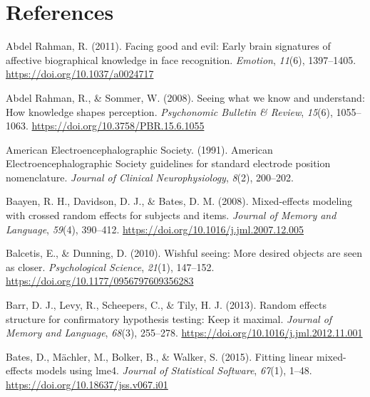 \documentclass[
  english,
  man,11pt,floatsintext]{apa7}
\begin{document}
\newpage

\hypertarget{references}{%
\section{References}\label{references}}

\setlength{\parindent}{-0.5in}
\setlength{\leftskip}{0.5in}

\hypertarget{refs}{}
\leavevmode\hypertarget{ref-abdelrahman2011}{}%
Abdel Rahman, R. (2011). Facing good and evil: Early brain signatures of affective biographical knowledge in face recognition. \emph{Emotion}, \emph{11}(6), 1397--1405. \url{https://doi.org/10.1037/a0024717}

\leavevmode\hypertarget{ref-abdelrahman2008}{}%
Abdel Rahman, R., \& Sommer, W. (2008). Seeing what we know and understand: How knowledge shapes perception. \emph{Psychonomic Bulletin \& Review}, \emph{15}(6), 1055--1063. \url{https://doi.org/10.3758/PBR.15.6.1055}

\leavevmode\hypertarget{ref-americanelectroencephalographicsociety1991}{}%
American Electroencephalographic Society. (1991). American Electroencephalographic Society guidelines for standard electrode position nomenclature. \emph{Journal of Clinical Neurophysiology}, \emph{8}(2), 200--202.

\leavevmode\hypertarget{ref-baayen2008}{}%
Baayen, R. H., Davidson, D. J., \& Bates, D. M. (2008). Mixed-effects modeling with crossed random effects for subjects and items. \emph{Journal of Memory and Language}, \emph{59}(4), 390--412. \url{https://doi.org/10.1016/j.jml.2007.12.005}

\leavevmode\hypertarget{ref-balcetis2010}{}%
Balcetis, E., \& Dunning, D. (2010). Wishful seeing: More desired objects are seen as closer. \emph{Psychological Science}, \emph{21}(1), 147--152. \url{https://doi.org/10.1177/0956797609356283}

\leavevmode\hypertarget{ref-barr2013}{}%
Barr, D. J., Levy, R., Scheepers, C., \& Tily, H. J. (2013). Random effects structure for confirmatory hypothesis testing: Keep it maximal. \emph{Journal of Memory and Language}, \emph{68}(3), 255--278. \url{https://doi.org/10.1016/j.jml.2012.11.001}

\leavevmode\hypertarget{ref-R-lme4}{}%
Bates, D., Mächler, M., Bolker, B., \& Walker, S. (2015). Fitting linear mixed-effects models using lme4. \emph{Journal of Statistical Software}, \emph{67}(1), 1--48. \url{https://doi.org/10.18637/jss.v067.i01}
\end{document}
